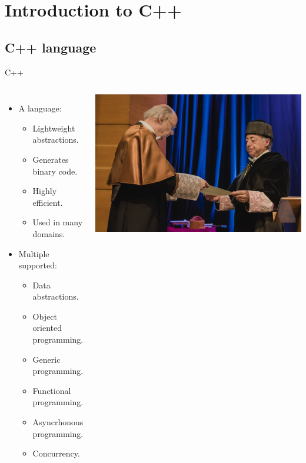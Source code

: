 \section{Introduction to C++}

\subsection{C++ language}

\begin{frame}[t]{C++}
\begin{columns}[T]


\begin{itemize}
  \item A  language:
    \begin{itemize}
      \item Lightweight abstractions.
      \item Generates binary code.
      \item Highly efficient.
      \item Used in many domains.
    \end{itemize}

  \item Multiple  supported:
    \begin{itemize}
      \item Data abstractions.
      \item Object oriented programming.
      \item Generic programming.
      \item Functional programming.
      \item Asyncrhonous programming.
      \item Concurrency.
    \end{itemize}
\end{itemize}


\pause
\vspace{-1em}
\begin{center}
\includegraphics[width=.5\textwidth]{images/bjarne-honoris.jpg}
\end{center}


\end{columns}
\end{frame}

